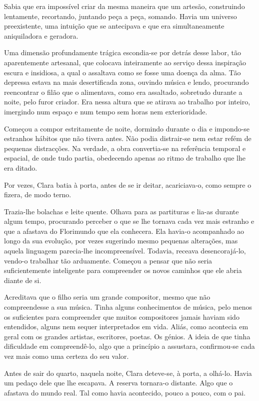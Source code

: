 Sabia que era impossível criar da mesma maneira que um artesão,
construindo lentamente, recortando, juntando peça a peça, somando. Havia
um universo preexistente, uma intuição que se antecipava e que era
simultaneamente aniquiladora e geradora.

Uma dimensão profundamente trágica escondia-se por detrás desse labor,
tão aparentemente artesanal, que colocava inteiramente ao serviço dessa
inspiração escura e insidiosa, a qual o assaltava como se fosse uma
doença da alma. Tão depressa estava na mais desertificada zona, ouvindo
música e lendo, procurando reencontrar o filão que o alimentava, como
era assaltado, sobretudo durante a noite, pelo furor criador. Era nessa
altura que se atirava ao trabalho por inteiro, imergindo num espaço e
num tempo sem horas nem exterioridade.

Começou a compor estritamente de noite, dormindo durante o dia e
impondo-se estranhos hábitos que não tivera antes. Não podia distrair-se
nem estar refém de pequenas distracções. Na verdade, a obra convertia-se
na referência temporal e espacial, de onde tudo partia, obedecendo
apenas ao ritmo de trabalho que lhe era ditado.

Por vezes, Clara batia à porta, antes de se ir deitar, acariciava-o,
como sempre o fizera, de modo terno.

Trazia-lhe bolachas e leite quente. Olhava para as partituras e lia-as
durante algum tempo, procurando perceber o que se lhe tornava cada vez
mais estranho e que a afastava do Florimundo que ela conhecera. Ela
havia-o acompanhado ao longo da sua evolução, por vezes sugerindo mesmo
pequenas alterações, mas aquela linguagem parecia-lhe incompreensível.
Todavia, receava desencorajá-lo, vendo-o trabalhar tão arduamente.
Começou a pensar que não seria suficientemente inteligente para
compreender os novos caminhos que ele abria diante de si.

Acreditava que o filho seria um grande compositor, mesmo que não
compreendesse a sua música. Tinha alguns conhecimentos de música, pelo
menos os suficientes para compreender que muitos compositores jamais
haviam sido entendidos, alguns nem sequer interpretados em vida. Aliás,
como acontecia em geral com os grandes artistas, escritores, poetas. Os
génios. A ideia de que tinha dificuldade em compreendê-lo, algo que a
princípio a assustara, confirmou-se cada vez mais como uma certeza do
seu valor.

Antes de sair do quarto, naquela noite, Clara deteve-se, à porta, a
olhá-lo. Havia um pedaço dele que lhe escapava. A reserva tornara-o
distante. Algo que o afastava do mundo real. Tal como havia acontecido,
pouco a pouco, com o pai.

